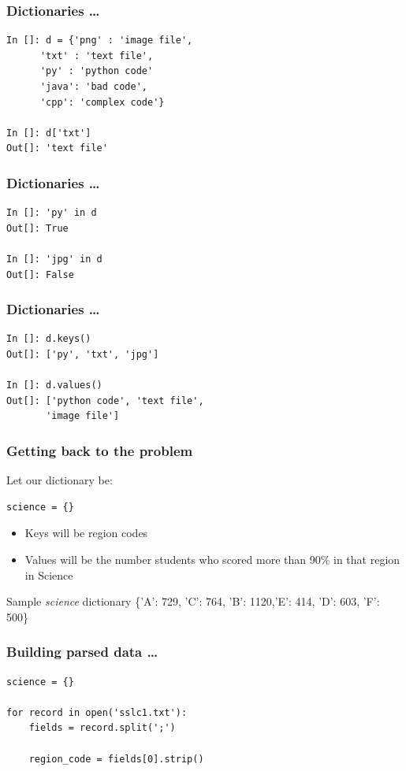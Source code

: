 \documentclass[14pt,compress]{beamer}
\newcounter{time}
\newcommand{\inctime}[1]{\addtocounter{time}{#1}{\tiny \thetime\ m}}
\begin{document}
\begin{frame}[fragile]
  \frametitle{Dictionaries \ldots}
  \begin{lstlisting}
In []: d = {'png' : 'image file',
      'txt' : 'text file', 
      'py' : 'python code'
      'java': 'bad code', 
      'cpp': 'complex code'}

In []: d['txt']
Out[]: 'text file'
  \end{lstlisting}
\end{frame}

\begin{frame}[fragile]
  \frametitle{Dictionaries \ldots}
  \begin{lstlisting}
In []: 'py' in d
Out[]: True

In []: 'jpg' in d
Out[]: False
  \end{lstlisting}
\end{frame}

\begin{frame}[fragile]
  \frametitle{Dictionaries \ldots}
  \begin{lstlisting}
In []: d.keys()
Out[]: ['py', 'txt', 'jpg']

In []: d.values()
Out[]: ['python code', 'text file',
       'image file']
  \end{lstlisting}
  \inctime{10}
\end{frame}

\begin{frame}[fragile]
  \frametitle{Getting back to the problem}
  Let our dictionary be:
  \begin{lstlisting}
science = {}
  \end{lstlisting}
\begin{itemize}
    \item Keys will be region codes
    \item Values will be the number students who scored more than 90\% in that region in Science
  \end{itemize}
  \begin{block}{Sample \emph{science} dictionary}
    \{'A': 729, 'C': 764, 'B': 1120,'E': 414, 'D': 603, 'F': 500\}
  \end{block}

\end{frame}

\begin{frame}[fragile]
  \frametitle{Building parsed data \ldots}
  \begin{lstlisting}
science = {}

for record in open('sslc1.txt'):
    fields = record.split(';')

    region_code = fields[0].strip()
  \end{lstlisting}
\end{frame}
\end{document}
